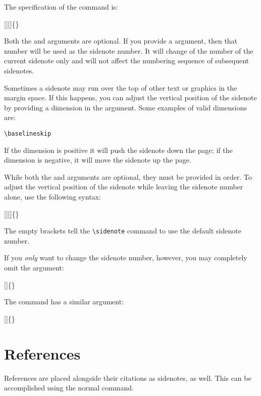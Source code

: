 The specification of the  command is:
\begin{docspec}
  [][]\{\}
\end{docspec}

Both the  and  arguments are optional.  If you
provide a  argument, then that number will be used as the
sidenote number.  It will change of the number of the current sidenote only and
will not affect the numbering sequence of subsequent sidenotes.

Sometimes a sidenote may run over the top of other text or graphics in the
margin space.  If this happens, you can adjust the vertical position of the
sidenote by providing a dimension in the  argument.  Some
examples of valid dimensions are:
\begin{docspec}
  \ttfamily 1.0in \qquad 2.54cm \qquad 254mm \Verb|\baselineskip|
\end{docspec}
If the dimension is positive it will push the sidenote down the page; if the
dimension is negative, it will move the sidenote up the page.

While both the  and  arguments are optional, they
must be provided in order.  To adjust the vertical position of the sidenote
while leaving the sidenote number alone, use the following syntax:
\begin{docspec}
  [][]\{\}
\end{docspec}
The empty brackets tell the \Verb|\sidenote| command to use the default
sidenote number.

If you \emph{only} want to change the sidenote number, however, you may
completely omit the  argument:
\begin{docspec}
  []\{\}
\end{docspec}

The  command has a similar  argument:
\begin{docspec}
  []\{\}
\end{docspec}

\section{References}
References are placed alongside their citations as sidenotes,
as well.  This can be accomplished using the normal 
command.


